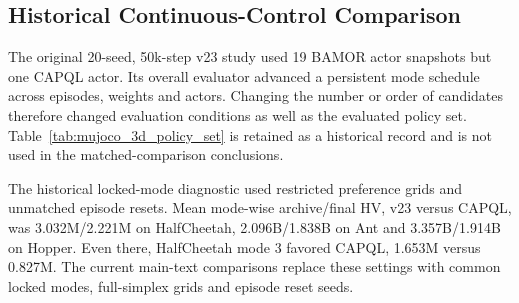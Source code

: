 \subsection{Historical Continuous-Control Comparison}
\label{app:historical_continuous}

The original 20-seed, 50k-step v23 study used 19 BAMOR actor snapshots but
one CAPQL actor. Its overall evaluator advanced a persistent mode schedule
across episodes, weights and actors. Changing the number or order of candidates
therefore changed evaluation conditions as well as the evaluated policy set.
Table~\ref{tab:mujoco_3d_policy_set} is retained as a historical record and is
not used in the matched-comparison conclusions.



The historical locked-mode diagnostic used restricted preference grids and
unmatched episode resets. Mean mode-wise archive/final HV, v23 versus CAPQL,
was 3.032M/2.221M on HalfCheetah, 2.096B/1.838B on Ant and 3.357B/1.914B
on Hopper. Even there, HalfCheetah mode 3 favored CAPQL, 1.653M versus 0.827M.
The current main-text comparisons replace these settings with common locked
modes, full-simplex grids and episode reset seeds.
\FloatBarrier
